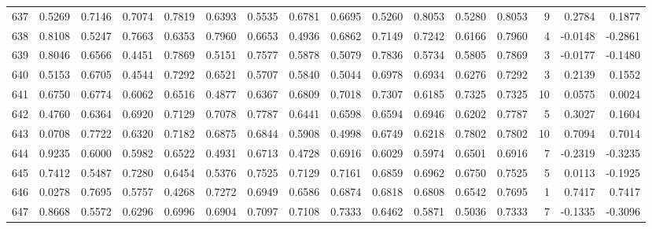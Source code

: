 \begin{tabular}{lrrrrrrrrrrrrrrr}
637 &      0.5269 &  0.7146 &  0.7074 &  0.7819 &  0.6393 &  0.5535 &  0.6781 &  0.6695 &  0.5260 &  0.8053 &   0.5280 &     0.8053 &      9 &                    0.2784 &                     0.1877 \\
638 &      0.8108 &  0.5247 &  0.7663 &  0.6353 &  0.7960 &  0.6653 &  0.4936 &  0.6862 &  0.7149 &  0.7242 &   0.6166 &     0.7960 &      4 &                   -0.0148 &                    -0.2861 \\
639 &      0.8046 &  0.6566 &  0.4451 &  0.7869 &  0.5151 &  0.7577 &  0.5878 &  0.5079 &  0.7836 &  0.5734 &   0.5805 &     0.7869 &      3 &                   -0.0177 &                    -0.1480 \\
640 &      0.5153 &  0.6705 &  0.4544 &  0.7292 &  0.6521 &  0.5707 &  0.5840 &  0.5044 &  0.6978 &  0.6934 &   0.6276 &     0.7292 &      3 &                    0.2139 &                     0.1552 \\
641 &      0.6750 &  0.6774 &  0.6062 &  0.6516 &  0.4877 &  0.6367 &  0.6809 &  0.7018 &  0.7307 &  0.6185 &   0.7325 &     0.7325 &     10 &                    0.0575 &                     0.0024 \\
642 &      0.4760 &  0.6364 &  0.6920 &  0.7129 &  0.7078 &  0.7787 &  0.6441 &  0.6598 &  0.6594 &  0.6946 &   0.6202 &     0.7787 &      5 &                    0.3027 &                     0.1604 \\
643 &      0.0708 &  0.7722 &  0.6320 &  0.7182 &  0.6875 &  0.6844 &  0.5908 &  0.4998 &  0.6749 &  0.6218 &   0.7802 &     0.7802 &     10 &                    0.7094 &                     0.7014 \\
644 &      0.9235 &  0.6000 &  0.5982 &  0.6522 &  0.4931 &  0.6713 &  0.4728 &  0.6916 &  0.6029 &  0.5974 &   0.6501 &     0.6916 &      7 &                   -0.2319 &                    -0.3235 \\
645 &      0.7412 &  0.5487 &  0.7280 &  0.6454 &  0.5376 &  0.7525 &  0.7129 &  0.7161 &  0.6859 &  0.6962 &   0.6750 &     0.7525 &      5 &                    0.0113 &                    -0.1925 \\
646 &      0.0278 &  0.7695 &  0.5757 &  0.4268 &  0.7272 &  0.6949 &  0.6586 &  0.6874 &  0.6818 &  0.6808 &   0.6542 &     0.7695 &      1 &                    0.7417 &                     0.7417 \\
647 &      0.8668 &  0.5572 &  0.6296 &  0.6996 &  0.6904 &  0.7097 &  0.7108 &  0.7333 &  0.6462 &  0.5871 &   0.5036 &     0.7333 &      7 &                   -0.1335 &                    -0.3096 \\

\end{tabular}
